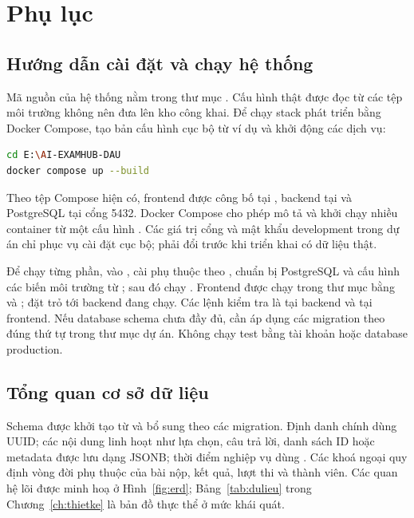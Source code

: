 \chapter{Phụ lục}
\label{ch:phuluc}

\section{Hướng dẫn cài đặt và chạy hệ thống}
\label{sec:huongdan-run}

Mã nguồn của hệ thống nằm trong thư mục . Cấu hình thật được đọc từ các tệp môi trường không nên đưa
lên kho công khai. Để chạy stack phát triển bằng Docker Compose, tạo bản
cấu hình cục bộ từ ví dụ và khởi động các dịch vụ:

\begin{lstlisting}[language=bash, caption={Các lệnh khởi chạy stack phát triển.}]
cd E:\AI-EXAMHUB-DAU
docker compose up --build
\end{lstlisting}

Theo tệp Compose hiện có, frontend được công bố tại
, backend tại 
và PostgreSQL tại cổng 5432. Docker Compose cho phép mô tả và khởi chạy
nhiều container từ một cấu hình \cite{DockerComposeDocs}. Các giá trị cổng
và mật khẩu development trong dự án chỉ phục vụ cài đặt cục bộ; phải đổi
trước khi triển khai có dữ liệu thật.

Để chạy từng phần, vào , cài phụ thuộc theo
, chuẩn bị PostgreSQL và cấu hình các biến môi
trường từ ; sau đó chạy . Frontend
được chạy trong thư mục  bằng  và
; đặt  trỏ tới backend đang chạy.
Các lệnh kiểm tra là  tại backend và
 tại frontend. Nếu database schema chưa đầy đủ, cần
áp dụng các migration theo đúng thứ tự trong thư mục dự án. Không chạy
test bằng tài khoản hoặc database production.

\section{Tổng quan cơ sở dữ liệu}
\label{sec:db-overview}

Schema được khởi tạo từ  và bổ sung theo các
migration. Định danh chính dùng UUID; các nội dung linh hoạt như lựa chọn,
câu trả lời, danh sách ID hoặc metadata được lưu dạng JSONB; thời điểm
nghiệp vụ dùng . Các khoá ngoại quy định vòng đời phụ
thuộc của bài nộp, kết quả, lượt thi và thành viên. Các quan hệ lõi được
minh hoạ ở Hình~\ref{fig:erd}; Bảng~\ref{tab:dulieu} trong
Chương~\ref{ch:thietke} là bản đồ thực thể ở mức khái quát.

